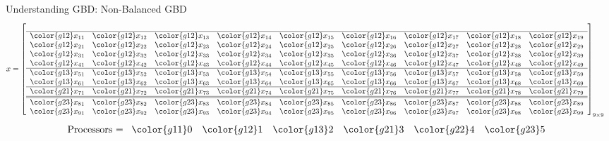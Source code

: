 \begin{frame}
\begin{exampleblock}{Understanding GBD:  Non-Balanced GBD}
\begin{align*}
x &= \left[
      \begin{array}{lllllllll}
      \\\hline
      \color{g12}x_{11} & \color{g12}x_{12} & \color{g12}x_{13} & \color{g12}x_{14} & 
\color{g12}x_{15} & \color{g12}x_{16} & \color{g12}x_{17} & \color{g12}x_{18} & \color{g12}x_{19}\\
      \color{g12}x_{21} & \color{g12}x_{22} & \color{g12}x_{23} & \color{g12}x_{24} & 
\color{g12}x_{25} & \color{g12}x_{26} & \color{g12}x_{27} & \color{g12}x_{28} & \color{g12}x_{29}\\
      \color{g12}x_{31} & \color{g12}x_{32} & \color{g12}x_{33} & \color{g12}x_{34} & 
\color{g12}x_{35} & \color{g12}x_{36} & \color{g12}x_{37} & \color{g12}x_{38} & \color{g12}x_{39}\\
      \color{g12}x_{41} & \color{g12}x_{42} & \color{g12}x_{43} & \color{g12}x_{44} & 
\color{g12}x_{45} & \color{g12}x_{46} & \color{g12}x_{47} & \color{g12}x_{48} & 
\color{g12}x_{49}\\\hline
      \color{g13}x_{51} & \color{g13}x_{52} & \color{g13}x_{53} & \color{g13}x_{54} & 
\color{g13}x_{55} & \color{g13}x_{56} & \color{g13}x_{57} & \color{g13}x_{58} & \color{g13}x_{59}\\
      \color{g13}x_{61} & \color{g13}x_{62} & \color{g13}x_{63} & \color{g13}x_{64} & 
\color{g13}x_{65} & \color{g13}x_{66} & \color{g13}x_{67} & \color{g13}x_{68} & 
\color{g13}x_{69}\\\hline
      \color{g21}x_{71} & \color{g21}x_{72} & \color{g21}x_{73} & \color{g21}x_{74} & 
\color{g21}x_{75} & \color{g21}x_{76} & \color{g21}x_{77} & \color{g21}x_{78} & 
\color{g21}x_{79}\\\hline\hline
      \color{g23}x_{81} & \color{g23}x_{82} & \color{g23}x_{83} & \color{g23}x_{84} & 
\color{g23}x_{85} & \color{g23}x_{86} & \color{g23}x_{87} & \color{g23}x_{88} & \color{g23}x_{89}\\
      \color{g23}x_{91} & \color{g23}x_{92} & \color{g23}x_{93} & \color{g23}x_{94} & 
\color{g23}x_{95} & \color{g23}x_{96} & \color{g23}x_{97} & \color{g23}x_{98} & \color{g23}x_{99}\\
      \end{array}
\right]_{9\times 9}
\end{align*}
\begin{align*}
\text{Processors = }
      \begin{array}{llllll}
      \color{g11}0 & \color{g12}1 & \color{g13}2 & \color{g21}3 & \color{g22}4 & \color{g23}5
      \end{array}
\end{align*}
\end{exampleblock}
\end{frame}


